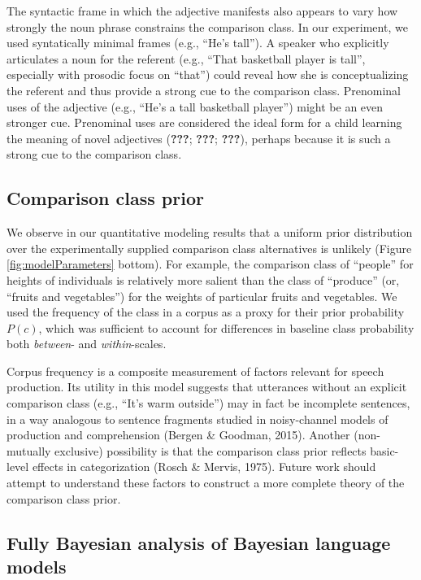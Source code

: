 \documentclass[doc]{apa6}
\begin{document}
The syntactic frame in which the adjective manifests also appears to
vary how strongly the noun phrase constrains the comparison class. In
our experiment, we used syntatically minimal frames (e.g., ``He's
tall''). A speaker who explicitly articulates a noun for the referent
(e.g., ``That basketball player is tall'', especially with
prosodic focus on ``that'') could reveal how she is
conceptualizing the referent and thus provide a strong cue to the
comparison class. Prenominal uses of the adjective (e.g., ``He's
a tall basketball player'') might be an even stronger cue. Prenominal
uses are considered the ideal form for a child learning the meaning of
novel adjectives ({\textbf{???}}; {\textbf{???}}; {\textbf{???}}),
perhaps because it is such a strong cue to the comparison class.

\subsection{Comparison class prior}

We observe in our quantitative modeling results that a uniform prior
distribution over the experimentally supplied comparison class
alternatives is unlikely (Figure \ref{fig:modelParameters} bottom). For
example, the comparison class of ``people'' for heights of
individuals is relatively more salient than the class of
``produce'' (or, ``fruits and vegetables'') for the weights
of particular fruits and vegetables. We used the frequency of the class
in a corpus as a proxy for their prior probability \(P(c)\), which was
sufficient to account for differences in baseline class probability both
\emph{between}- and \emph{within}-scales.

Corpus frequency is a composite measurement of factors relevant for
speech production. Its utility in this model suggests that utterances
without an explicit comparison class (e.g., ``It's warm outside'')
may in fact be incomplete sentences, in a way analogous to sentence
fragments studied in noisy-channel models of production and
comprehension (Bergen \& Goodman, 2015). Another (non-mutually
exclusive) possibility is that the comparison class prior reflects
basic-level effects in categorization (Rosch \& Mervis, 1975). Future
work should attempt to understand these factors to construct a more
complete theory of the comparison class prior.

\subsection{Fully Bayesian analysis of Bayesian language
models}
\end{document}
